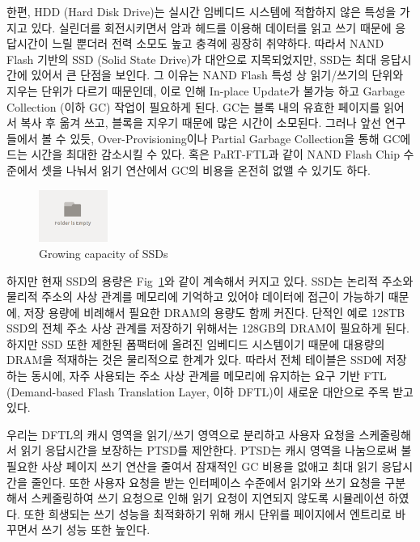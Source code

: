 \documentclass[conference]{IEEEtran}
\begin{document}
한편, HDD (Hard Disk Drive)는 실시간 임베디드 시스템에 적합하지 않은 특성을 가지고 있다. 실린더를 회전시키면서
암과 헤드를 이용해 데이터를 읽고 쓰기 때문에 응답시간이 느릴 뿐더러 전력 소모도 높고 충격에 굉장히 취약하다.
따라서 NAND Flash 기반의 SSD (Solid State Drive)가 대안으로 지목되었지만, SSD는 최대 응답시간에 있어서
큰 단점을 보인다. 그 이유는 NAND Flash 특성 상 읽기/쓰기의 단위와 지우는 단위가 다르기 때문인데,
이로 인해 In-place Update가 불가능 하고 Garbage Collection (이하 GC) 작업이 필요하게 된다.
GC는 블록 내의 유효한 페이지를 읽어서 복사 후 옮겨 쓰고, 블록을 지우기 때문에 많은 시간이 소모된다.
그러나 앞선 연구들에서 볼 수 있듯, Over-Provisioning이나 Partial Garbage Collection을 통해 
GC에 드는 시간을 최대한 감소시킬 수 있다. 혹은 PaRT-FTL과 같이 NAND Flash Chip 수준에서 셋을 나눠서
읽기 연산에서 GC의 비용을 온전히 없앨 수 있기도 하다. \par

\begin{figure}[h]
	\centering
	\includegraphics[width=0.2\textwidth]{image/bg.png}
	\caption{Growing capacity of SSDs}
	\label{fig:SSD_size}
\end{figure}

하지만 현재 SSD의 용량은 Fig~\ref{fig:SSD_size}와 같이 계속해서 커지고 있다. SSD는 논리적 주소와 물리적 주소의
사상 관계를 메모리에 기억하고 있어야 데이터에 접근이 가능하기 때문에, 저장 용량에 비례해서 필요한 DRAM의 용량도
함께 커진다. 단적인 예로 128TB SSD의 전체 주소 사상 관계를 저장하기 위해서는 128GB의 DRAM이 필요하게 된다.
하지만 SSD 또한 제한된 폼팩터에 올려진 임베디드 시스템이기 때문에 대용량의 DRAM을 적재하는 것은 물리적으로 한계가 있다.
따라서 전체 테이블은 SSD에 저장하는 동시에, 자주 사용되는 주소 사상 관계를 메모리에 유지하는 요구 기반 FTL
(Demand-based Flash Translation Layer, 이하 DFTL)이 새로운 대안으로 주목 받고 있다. \par

우리는 DFTL의 캐시 영역을 읽기/쓰기 영역으로 분리하고 사용자 요청을 스케줄링해서 읽기 응답시간을 보장하는
PTSD를 제안한다. PTSD는 캐시 영역을 나눔으로써 불필요한 사상 페이지 쓰기 연산을 줄여서 잠재적인 GC 비용을 없애고
최대 읽기 응답시간을 줄인다. 또한 사용자 요청을 받는 인터페이스 수준에서 읽기와 쓰기 요청을 구분해서 스케줄링하여
쓰기 요청으로 인해 읽기 요청이 지연되지 않도록 시뮬레이션 하였다. 또한 희생되는 쓰기 성능을 최적화하기 위해
캐시 단위를 페이지에서 엔트리로 바꾸면서 쓰기 성능 또한 높인다. \par
\end{document}
